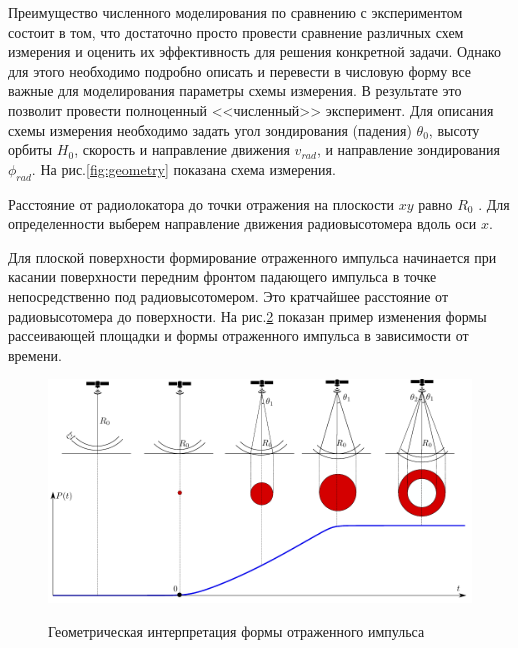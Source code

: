 Преимущество численного моделирования по сравнению с экспериментом состоит в
том, что достаточно просто провести сравнение различных схем измерения и
оценить их эффективность для решения конкретной задачи. Однако для этого
необходимо подробно описать и перевести в числовую форму все важные для
моделирования параметры схемы измерения. В результате это позволит провести
полноценный <<численный>> эксперимент.  Для описания схемы измерения необходимо
задать угол зондирования (падения) $\theta_0$, высоту орбиты $H_0$, скорость и
направление движения $v_{rad}$, и направление зондирования $\phi_{rad}$. На рис.\ref{fig:geometry} показана схема измерения. 

Расстояние от радиолокатора до точки отражения на плоскости $xy$ равно $R_0$ .
Для определенности выберем направление движения радиовысотомера вдоль оси $x$.


Для плоской поверхности формирование отраженного импульса начинается при
касании поверхности передним фронтом падающего импульса в точке непосредственно
под радиовысотомером. Это кратчайшее расстояние от радиовысотомера до
поверхности. На рис.\ref{fig:wave_form} показан пример изменения формы
рассеивающей площадки и формы отраженного импульса в зависимости от времени.
\begin{figure}[h]
    \centering
    \includegraphics[]{fig/flat_wave1.pdf}
    \caption{}
    \label{fig:}
\end{figure}

\begin{figure}[h]
    \centering
    \hfill
    \begin{subfigure}{0.25\linewidth}
        \centering
        
    \end{subfigure}
    \hfill
    \begin{subfigure}{0.25\linewidth}
        \centering
        
    \end{subfigure}
    \hfill
    \begin{subfigure}{0.25\linewidth}
        \centering
        
    \end{subfigure}
    \label{fig:wave_form}
    \caption{Геометрическая интерпретация формы отраженного импульса}
\end{figure}

